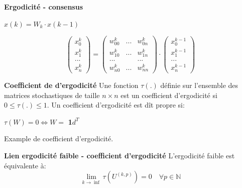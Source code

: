 \documentclass{beamer}
\begin{document}
\begin{frame}
	\textbf{Ergodicité - consensus}

	\begin{center}		
		$ x(k) = W_k \cdot x(k-1)$
	\end{center}

	\begin{equation}
		\nonumber
		\begin{pmatrix}
			x^k_0\\
			x^k_1\\
			...\\
			x^k_n
		\end{pmatrix}
		=
		\begin{pmatrix}
			w^k_{00} & ... & w^k_{0n}\\
			w^k_{10} & ... & w^k_{1n}\\
			... &  & ... \\
			w^k_{n0} & ... & w^k_{nn}
		\end{pmatrix}
		\cdot
		\begin{pmatrix}
			x^{k-1}_0\\
			x^{k-1}_1\\
			...\\
			x^{k-1}_n
		\end{pmatrix}
	\end{equation}
\end{frame}

\begin{frame}
	\textbf{Coefficient de d'ergodicité}
		Une fonction $\tau(.)$ définie sur l'ensemble des matrices stochastiques de taille $n \times n$ est un coefficient d'ergodicité si $0 \leq \tau(.) \leq 1$.
		\bigbreak
		\pause
		Un coefficient d'ergodicité est dît propre si:
		\begin{center}
			$\tau(W) = 0 \iff W = $ \textbf{1}$d^T$
		\end{center}
		\pause
		Example de coefficient d'ergodicité.
\end{frame}

\begin{frame}
	\textbf{Lien ergodicité faible - coefficient d'ergodicité}
	L'ergodicité faible est équivalente à:
	\begin{equation}
		\nonumber
		\lim_{k \to \inf} \tau(U^{(k, p)}) = 0 \quad \forall p \in \mathbb{N} 
	\end{equation}
\end{frame}
\end{document}

